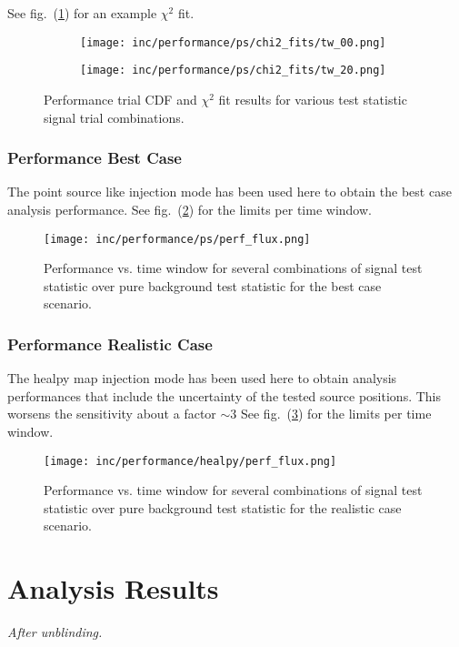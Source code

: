 See fig.~(\ref{fig:performance_chi2}) for an example $\chi^2$ fit.
\begin{figure}[htbp]
  \centering
  \begin{subfigure}[c]{0.45\textwidth}
    \texttt{[image: inc/performance/ps/chi2\_fits/tw\_00.png]}
  \end{subfigure}
  \hfill
  \begin{subfigure}[c]{0.45\textwidth}
    \texttt{[image: inc/performance/ps/chi2\_fits/tw\_20.png]}
  \end{subfigure}
  \caption{Performance trial CDF and $\chi^2$ fit results for various test statistic signal trial combinations.}
  \label{fig:performance_chi2}
\end{figure}

\subsubsection*{Performance Best Case}
The point source like injection mode has been used here to obtain the best case analysis performance.
See fig.~(\ref{fig:performance_ps_flux}) for the limits per time window.
\begin{figure}[htbp]
  \centering
  \texttt{[image: inc/performance/ps/perf\_flux.png]}
  \caption{Performance vs. time window for several combinations of signal test statistic over pure background test statistic for the best case scenario.}
  \label{fig:performance_ps_flux}
\end{figure}

\subsubsection*{Performance Realistic Case}
The healpy map injection mode has been used here to obtain analysis performances that include the uncertainty of the tested source positions.
This worsens the sensitivity about a factor $\sim 3$
See fig.~(\ref{fig:performance_healpy_flux}) for the limits per time window.
\begin{figure}[htbp]
  \centering
  \texttt{[image: inc/performance/healpy/perf\_flux.png]}
  \caption{Performance vs. time window for several combinations of signal test statistic over pure background test statistic for the realistic case scenario.}
  \label{fig:performance_healpy_flux}
\end{figure}



\section{Analysis Results}
\emph{After unblinding.}



